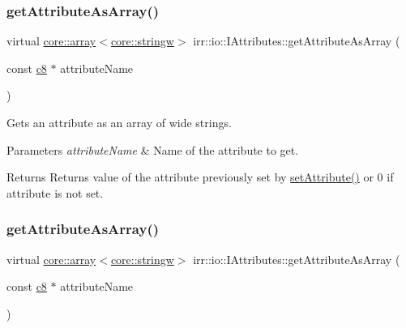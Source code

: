 \subsubsection{\texorpdfstring{get\+Attribute\+As\+Array()}{getAttributeAsArray()}\hspace{0.1cm}{\footnotesize\ttfamily [1/4]}}
{\footnotesize\ttfamily virtual \hyperlink{classirr_1_1core_1_1array}{core\+::array}$<$\hyperlink{namespaceirr_1_1core_a5aedb62cb47cf01d1c548ab5e6344d2d}{core\+::stringw}$>$ irr\+::io\+::\+I\+Attributes\+::get\+Attribute\+As\+Array (\begin{DoxyParamCaption}\item[{const \hyperlink{namespaceirr_a9395eaea339bcb546b319e9c96bf7410}{c8} $\ast$}]{attribute\+Name }\end{DoxyParamCaption})\hspace{0.3cm}{\ttfamily [pure virtual]}}



Gets an attribute as an array of wide strings. 


\begin{DoxyParams}{Parameters}
{\em attribute\+Name} & Name of the attribute to get. \\
\hline
\end{DoxyParams}
\begin{DoxyReturn}{Returns}
Returns value of the attribute previously set by \hyperlink{classirr_1_1io_1_1IAttributes_a03fa31acb481ae23678676cc183f09a6}{set\+Attribute()} or 0 if attribute is not set. 
\end{DoxyReturn}
\mbox{\label{classirr_1_1io_1_1IAttributes_af4fb7e071a70bc0e9c57099bc04eda4f}} 
\subsubsection{\texorpdfstring{get\+Attribute\+As\+Array()}{getAttributeAsArray()}\hspace{0.1cm}{\footnotesize\ttfamily [2/4]}}
{\footnotesize\ttfamily virtual \hyperlink{classirr_1_1core_1_1array}{core\+::array}$<$\hyperlink{namespaceirr_1_1core_a5aedb62cb47cf01d1c548ab5e6344d2d}{core\+::stringw}$>$ irr\+::io\+::\+I\+Attributes\+::get\+Attribute\+As\+Array (\begin{DoxyParamCaption}\item[{const \hyperlink{namespaceirr_a9395eaea339bcb546b319e9c96bf7410}{c8} $\ast$}]{attribute\+Name }\end{DoxyParamCaption})\hspace{0.3cm}{\ttfamily [pure virtual]}}



